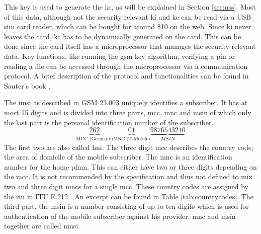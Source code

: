 This key is used to generate the \gls{kc}, as will be explained in Section \ref{sec:nss}.
Most of this data, although not the security relevant \gls{ki} and \gls{kc} can be read via a USB \gls{sim} card reader, which can be bought for around \$10 on the web.
Since \gls{ki} never leaves the card, \gls{kc} has to be dynamically generated on the card.
This can be done since the card itself has a microprocessor that manages the security relevant data.
Key functions, like running the \gls{gsm} key algorithm, verifying a \gls{pin} or reading a file can be accessed through the microprocessor via a communication protocol.
A brief description of the protocol and functionalities can be found in Sauter's book \cite{kommsys2006}.

The \gls{imsi} as described in GSM 23.003 \cite{GSM23003} uniquely identifies a subscriber.
It has at most 15 digits and is divided into three parts, \gls{mcc}, \gls{mnc} and \gls{msin} of which only the last part is the personal identification number of the subscriber.
\[\underbrace{262}_{\text{MCC (Germany)}} \underbrace{01}_{\text{MNC (T-Mobile)}} \underbrace{9876543210}_{MSIN}\]
The first two are also called \gls{hni}.
The three digit \gls{mcc} describes the country code, the area of domicile of the mobile subscriber.
The \gls{mnc} is an identification number for the home \gls{plmn}.
This can either have two or three digits depending on the \gls{mcc}.
It is not recommended by the specification and thus not defined to mix two and three digit \gls{mnc}s for a single \gls{mcc}.
These country codes are assigned by the \gls{itu} in ITU E.212 \cite{ITU212}.
An excerpt can be found in Table \ref{tab:countrycodes}.
The third part, the \gls{msin} is a number consisting of up to ten digits which is used for authentication of the mobile subscriber against his provider.
\gls{mnc} and \gls{msin} together are called \gls{nmsi}.
